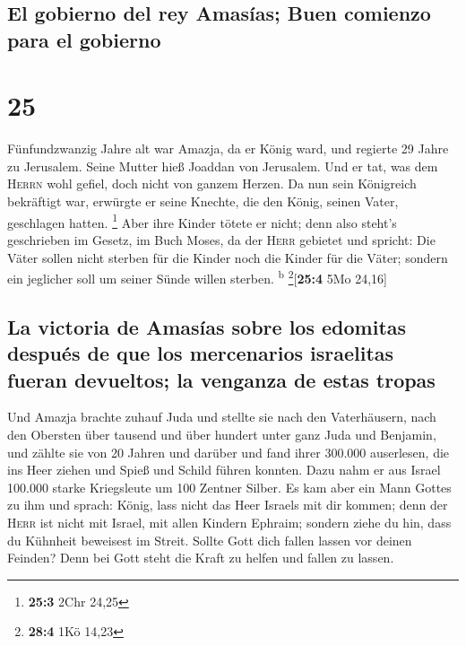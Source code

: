 \hypertarget{el-gobierno-del-rey-amasuxedas-buen-comienzo-para-el-gobierno}{%
\subsection{El gobierno del rey Amasías; Buen comienzo para el
gobierno}\label{el-gobierno-del-rey-amasuxedas-buen-comienzo-para-el-gobierno}}

\hypertarget{section-24}{%
\section{25}\label{section-24}}

 Fünfundzwanzig Jahre alt war Amazja, da er König ward,
und regierte 29 Jahre zu Jerusalem. Seine Mutter hieß Joaddan von
Jerusalem.  Und er tat, was dem \textsc{Herrn} wohl
gefiel, doch nicht von ganzem Herzen.  Da nun sein
Königreich bekräftigt war, erwürgte er seine Knechte, die den König,
seinen Vater, geschlagen hatten. \footnote{\textbf{25:3} 2Chr 24,25}
 Aber ihre Kinder tötete er nicht; denn also steht's
geschrieben im Gesetz, im Buch Moses, da der \textsc{Herr} gebietet und
spricht: Die Väter sollen nicht sterben für die Kinder noch die Kinder
für die Väter; sondern ein jeglicher soll um seiner Sünde willen
sterben. \textsuperscript{b} \footnote{\textbf{28:4} 1Kö 14,23}{[}\textbf{25:4}
5Mo 24,16{]}

\hypertarget{la-victoria-de-amasuxedas-sobre-los-edomitas-despuuxe9s-de-que-los-mercenarios-israelitas-fueran-devueltos-la-venganza-de-estas-tropas}{%
\subsection{La victoria de Amasías sobre los edomitas después de que los
mercenarios israelitas fueran devueltos; la venganza de estas
tropas}\label{la-victoria-de-amasuxedas-sobre-los-edomitas-despuuxe9s-de-que-los-mercenarios-israelitas-fueran-devueltos-la-venganza-de-estas-tropas}}

 Und Amazja brachte zuhauf Juda und stellte sie nach den
Vaterhäusern, nach den Obersten über tausend und über hundert unter ganz
Juda und Benjamin, und zählte sie von 20 Jahren und darüber und fand
ihrer 300.000 auserlesen, die ins Heer ziehen und Spieß und Schild
führen konnten.  Dazu nahm er aus Israel 100.000 starke
Kriegsleute um 100 Zentner Silber.  Es kam aber ein Mann
Gottes zu ihm und sprach: König, lass nicht das Heer Israels mit dir
kommen; denn der \textsc{Herr} ist nicht mit Israel, mit allen Kindern
Ephraim;  sondern ziehe du hin, dass du Kühnheit beweisest
im Streit. Sollte Gott dich fallen lassen vor deinen Feinden? Denn bei
Gott steht die Kraft zu helfen und fallen zu lassen.

